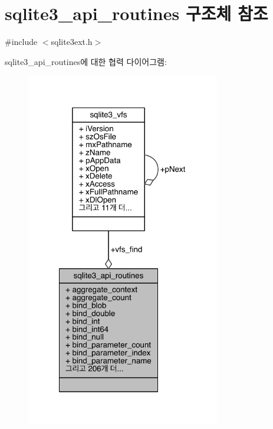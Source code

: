 \hypertarget{structsqlite3__api__routines}{}\section{sqlite3\+\_\+api\+\_\+routines 구조체 참조}
\label{structsqlite3__api__routines}


{\ttfamily \#include $<$sqlite3ext.\+h$>$}



sqlite3\+\_\+api\+\_\+routines에 대한 협력 다이어그램\+:
\nopagebreak
\begin{figure}[H]
\begin{center}
\leavevmode
\includegraphics[width=240pt]{d6/de2/structsqlite3__api__routines__coll__graph}
\end{center}
\end{figure}
